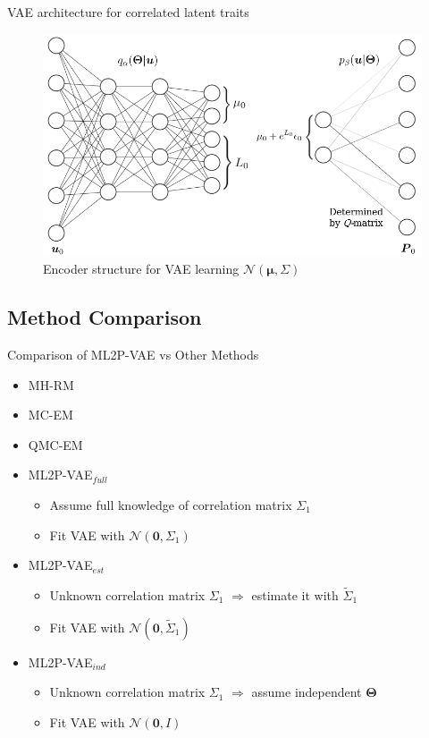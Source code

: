\documentclass{beamer}
\newcommand{\vect}[1]{\boldsymbol{#1}}
\theoremstyle{definition}
\begin{document}
\begin{frame}{VAE architecture for correlated latent traits}
  \begin{figure}
  \includegraphics[width=.7\textwidth]{../img/ml2pvae_visual.png}
\caption*{Encoder structure for VAE learning $\mathcal{N}(\vect\mu,\Sigma)$}
\end{figure}
\end{frame}


\subsection{Method Comparison}

\begin{frame}{Comparison of ML2P-VAE vs Other Methods}
  \begin{itemize}
    \item MH-RM 
    \item MC-EM 
    \item QMC-EM
    \item ML2P-VAE$_{full}$ 
      \begin{itemize}
        \item Assume full knowledge of correlation matrix $\Sigma_1$
        \item Fit VAE with $\mathcal{N}(\vect 0, \Sigma_1)$
      \end{itemize}
    \item ML2P-VAE$_{est}$ 
      \begin{itemize}
        \item Unknown correlation matrix $\Sigma_1$ $\Rightarrow$ estimate it with $\tilde \Sigma_1$
        \item Fit VAE with $\mathcal{N}(\vect 0, \tilde \Sigma_1)$
      \end{itemize}
    \item ML2P-VAE$_{ind}$ 
      \begin{itemize}
        \item Unknown correlation matrix $\Sigma_1$ $\Rightarrow$ assume independent $\vect \Theta$
        \item Fit VAE with $\mathcal{N}(\vect 0, I)$
      \end{itemize}
  \end{itemize}
\end{frame}
\end{document}
